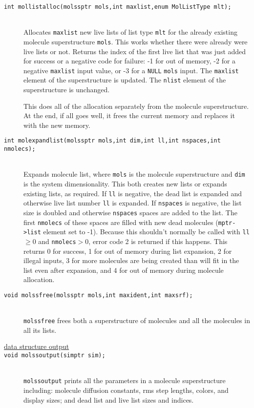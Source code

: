 \documentclass {book}
\newcommand {\ttt} {\texttt}
\begin{document}
\begin{description}
\item[\ttt{int mollistalloc(molssptr mols,int maxlist,enum MolListType mlt);}]
\hfill \\
Allocates \ttt{maxlist} new live lists of list type \ttt{mlt} for the already existing molecule superstructure \ttt{mols}. This works whether there were already were live lists or not. Returns the index of the first live list that was just added for success or a negative code for failure: -1 for out of memory, -2 for a negative \ttt{maxlist} input value, or -3 for a \ttt{NULL} \ttt{mols} input. The \ttt{maxlist} element of the superstructure is updated. The \ttt{nlist} element of the superstructure is unchanged.

This does all of the allocation separately from the molecule superstructure. At the end, if all goes well, it frees the current memory and replaces it with the new memory.

\item[\ttt{int molexpandlist(molssptr mols,int dim,int ll,int nspaces,int nmolecs);}]
\hfill \\
Expands molecule list, where \ttt{mols} is the molecule superstructure and \ttt{dim} is the system dimensionality. This both creates new lists or expands existing lists, as required. If \ttt{ll} is negative, the dead list is expanded and otherwise live list number \ttt{ll} is expanded. If \ttt{nspaces} is negative, the list size is doubled and otherwise \ttt{nspaces} spaces are added to the list. The first \ttt{nmolecs} of these spaces are filled with new dead molecules (\ttt{mptr->list} element set to -1). Because this shouldn't normally be called with \ttt{ll}$\ge$0 and \ttt{nmolecs}$>$0, error code 2 is returned if this happens. This returns 0 for success, 1 for out of memory during list expansion, 2 for illegal inputs, 3 for more molecules are being created than will fit in the list even after expansion, and 4 for out of memory during molecule allocation.

\item[\ttt{void molssfree(molssptr mols,int maxident,int maxsrf);}]
\hfill \\
\ttt{molssfree} frees both a superstructure of molecules and all the molecules in all its lists.

\item[\underline{data structure output}]

\item[\ttt{void molssoutput(simptr sim);}]
\hfill \\
\ttt{molssoutput} prints all the parameters in a molecule superstructure including: molecule diffusion constants, rms step lengths, colors, and display sizes; and dead list and live list sizes and indices.


\end{description}
\end{document}

